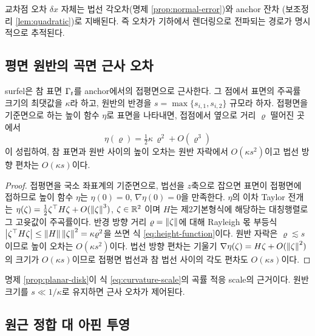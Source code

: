 교차점 오차 $\delta x$ 자체는 법선 각오차(명제 \ref{prop:normal-error})와 anchor 잔차
(보조정리 \ref{lem:quadratic})로 지배된다. 즉 오차가 기하에서 렌더링으로 전파되는
경로가 명시적으로 추적된다.

\subsection{평면 원반의 곡면 근사 오차}

\begin{proposition}[평면 원반의 곡률 기반 근사 오차]
\label{prop:planar-disk}
surfel은 참 표면 $\Gamma_t$를 anchor에서의 접평면으로 근사한다. 그 점에서 표면의
주곡률 크기의 최댓값을 $\kappa$라 하고, 원반의 반경을
$s=\max\{s_{i,1},s_{i,2}\}$ 규모라 하자. 접평면을 기준면으로 하는 높이 함수
$\eta$로 표면을 나타내면, 접점에서 옆으로 거리 $\varrho$ 떨어진 곳에서
\begin{equation}
  \eta(\varrho) = \tfrac{1}{2}\kappa\,\varrho^2 + O(\varrho^3)
  \label{eq:height-function}
\end{equation}
이 성립하여, 참 표면과 원반 사이의 높이 오차는 원반 자락에서 $O(\kappa s^2)$이고 법선
방향 편차는 $O(\kappa s)$이다.
\end{proposition}

\begin{proof}
접평면을 국소 좌표계의 기준면으로, 법선을 $z$축으로 잡으면 표면이 접평면에 접하므로
높이 함수 $\eta$는 $\eta(0)=0$, $\nabla\eta(0)=0$을 만족한다. $\eta$의 이차 Taylor
전개는 $\eta(\zeta) = \tfrac12\zeta^{\top} H\zeta + O(\left\lVert \zeta \right\rVert^3)$, $\zeta\in\mathbb{R}^2$
이며 $H$는 제2기본형식에 해당하는 대칭행렬로 그 고윳값이 주곡률이다. 반경 방향 거리
$\varrho=\left\lVert \zeta \right\rVert$에 대해 Rayleigh 몫 부등식
$\left\lvert \zeta^{\top} H\zeta \right\rvert\le\left\lVert H \right\rVert\left\lVert \zeta \right\rVert^2 = \kappa\varrho^2$을 쓰면 식
\eqref{eq:height-function}이다. 원반 자락은 $\varrho\lesssim s$이므로 높이 오차는
$O(\kappa s^2)$이다. 법선 방향 편차는 기울기
$\nabla\eta(\zeta) = H\zeta + O(\left\lVert \zeta \right\rVert^2)$의 크기가 $O(\kappa s)$이므로 접평면
법선과 참 법선 사이의 각도 편차도 $O(\kappa s)$이다.
\end{proof}

명제 \ref{prop:planar-disk}이 식 \eqref{eq:curvature-scale}의 곡률 적응 scale의 근거이다.
원반 크기를 $s \ll 1/\kappa$로 유지하면 근사 오차가 제어된다.

\subsection{원근 정합 대 아핀 투영}

